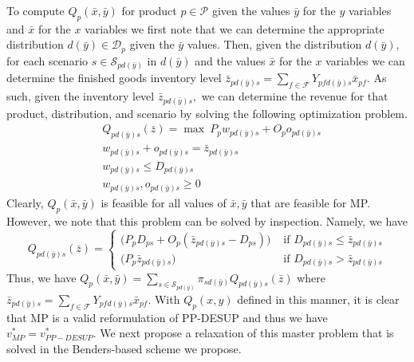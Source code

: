 \documentclass[12pt]{article}
\theoremstyle{thmstylethree}%
\begin{document}
To compute $Q_{p}(\bar{x},\bar{y})$ for product $p \in \mathcal{P}$ given the values $\bar{y}$ for the $y$ variables and $\bar{x}$ for the $x$ variables we first note that we can determine the appropriate distribution $d(\bar{y}) \in \mathcal{D}_{p}$ given the $\bar{y}$ values. Then, given the distribution $d(\bar{y})$, for each scenario $s \in \mathcal{S}_{pd(\bar{y})}$ in $d(\bar{y})$ and the values $\bar{x}$ for the $x$ variables we can determine the finished goods inventory level  $\bar{z}_{pd(\bar{y})s} = \sum_{f \in \mathcal{F}} Y_{pfd(\bar{y})s}\bar{x}_{pf}.$ As such, given the inventory level $\bar{z}_{pd(\bar{y})s},$ we can determine the revenue for that product, distribution, and scenario by solving the following optimization problem.
\begin{subequations}
\label{eq:spv1}
\begin{align}
    \label{eq:sub:mrh:obj} & Q_{pd(\bar{y})s}(\bar{z}) = \max~ P_p w_{pd(\bar{y})s}+O_{p}o_{pd(\bar{y})s}\\
\label{eq:subproblem:c5}  &w_{pd(\bar{y})s} + o_{pd(\bar{y})s}= \bar{z}_{pd(\bar{y})s} \\
\label{eq:subproblem:c6}  &w_{pd(\bar{y})s}\leq D_{pd(\bar{y})s} \\
\label{eq:subproblem:c7} & w_{pd(\bar{y})s},o_{pd(\bar{y})s} \geq 0 
\end{align}
\end{subequations}
Clearly, $Q_{p}(\bar x, \bar y)$ is feasible for all values of $\bar x, \bar y$ that are feasible for MP. However, we note that this problem can be solved by inspection. Namely, we have
\begin{equation}
   Q_{pd(\bar{y})s}(\bar{z}) = \begin{cases} 
    \bigg(P_p D_{ps} + O_{p}(\bar{z}_{pd(\bar{y})s} - D_{ps}) \bigg) & \mbox{ if } D_{pd(\bar{y})s} \leq \bar{z}_{pd(\bar{y})s} \\
    \bigg(P_p \bar{z}_{pd(\bar{y})s} \bigg) & \mbox{ if } D_{pd(\bar{y})s} > \bar{z}_{pd(\bar{y})s}
    \end{cases}
\end{equation}
Thus, we have $Q_{p}(\bar x, \bar y) = \sum_{s \in\mathcal{S}_{pd(\bar{y})}} \pi_{sd(\bar{y})}  Q_{pd(\bar{y})s}(\bar{z})$ where $\bar{z}_{pd(\bar{y})s} = \sum_{f \in \mathcal{F}} Y_{pfd(\bar{y})s}\bar{x}_{pf}.$ With $Q_{p}(x,y)$ defined in this manner, it is clear that MP is a valid reformulation of PP-DESUP and thus we have $v_{MP}^{*} = v_{PP-DESUP}^{*}.$ We next propose a relaxation of this master problem that is solved in the Benders-based scheme we propose. 
\end{document}
